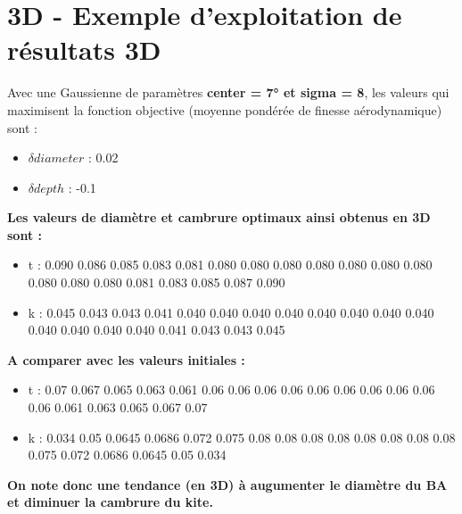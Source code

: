 
\section{3D - Exemple d'exploitation de résultats 3D}
\label{sec:Ch3.5}

Avec une Gaussienne de paramètres \textbf{center = 7° et sigma = 8}, les valeurs qui maximisent la fonction objective (moyenne pondérée de finesse aérodynamique) sont :
\begin{itemize}
    \item $\delta diameter$ : 0.02
    \item $\delta depth$ : -0.1
\end{itemize}
\smallskip

\textbf{Les valeurs de diamètre et cambrure optimaux ainsi obtenus en 3D sont : 
}
\begin{itemize}
    \item t : 0.090 0.086 0.085 0.083 0.081 0.080 0.080  0.080 0.080 0.080 0.080  0.080 0.080 0.080 0.080 0.081 0.083 0.085 0.087 0.090
    \item k : 0.045 0.043 0.043 0.041 0.040 0.040 0.040  0.040 0.040 0.040 0.040 0.040 0.040 0.040  0.040 0.040 0.041 0.043 0.043 0.045
\end{itemize}
\smallskip

\textbf{A comparer avec les valeurs initiales :}
\begin{itemize}
    \item t : 0.07 0.067 0.065 0.063 0.061 0.06 0.06  0.06 0.06 0.06  0.06  0.06 0.06 0.06  0.06 0.061 0.063 0.065 0.067 0.07
    \item k : 0.034 0.05 0.0645 0.0686 0.072 0.075 0.08 0.08 0.08 0.08 0.08 0.08 0.08 0.08 0.075 0.072 0.0686 0.0645 0.05 0.034
\end{itemize}

\textbf{On note donc une tendance (en 3D) à augumenter le diamètre du BA et diminuer la cambrure du kite. }
